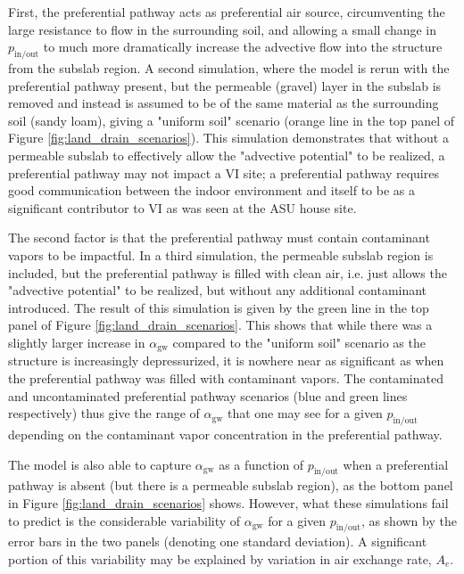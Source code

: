 \documentclass[journal=esthag,manuscript=article]{achemso}
\begin{document}
First, the preferential pathway acts as preferential air source, circumventing the large resistance to flow in the surrounding soil, and allowing a small change in $p_\mathrm{in/out}$ to much more dramatically increase the advective flow into the structure from the subslab region.
A second simulation, where the model is rerun with the preferential pathway present, but the permeable (gravel) layer in the subslab is removed and instead is assumed to be of the same material as the surrounding soil (sandy loam), giving a "uniform soil" scenario (orange line in the top panel of Figure \ref{fig:land_drain_scenarios}).
This simulation demonstrates that without a permeable subslab to effectively allow the "advective potential" to be realized, a preferential pathway may not impact a VI site; a preferential pathway requires good communication between the indoor environment and itself to be as a significant contributor to VI as was seen at the ASU house site.

The second factor is that the preferential pathway must contain contaminant vapors to be impactful.
In a third simulation, the permeable subslab region is included, but the preferential pathway is filled with clean air, i.e. just allows the "advective potential" to be realized, but without any additional contaminant introduced.
The result of this simulation is given by the green line in the top panel of Figure \ref{fig:land_drain_scenarios}.
This shows that while there was a slightly larger increase in $\alpha_\mathrm{gw}$ compared to the "uniform soil" scenario as the structure is increasingly depressurized, it is nowhere near as significant as when the preferential pathway was filled with contaminant vapors.
The contaminated and uncontaminated preferential pathway scenarios (blue and green lines respectively) thus give the range of $\alpha_\mathrm{gw}$ that one may see for a given $p_\mathrm{in/out}$ depending on the contaminant vapor concentration in the preferential pathway.

The model is also able to capture $\alpha_\mathrm{gw}$ as a function of $p_\mathrm{in/out}$ when a preferential pathway is absent (but there is a permeable subslab region), as the bottom panel in Figure \ref{fig:land_drain_scenarios} shows.
However, what these simulations fail to predict is the considerable variability of $\alpha_\mathrm{gw}$ for a given $p_\mathrm{in/out}$, as shown by the error bars in the two panels (denoting one standard deviation).
A significant portion of this variability may be explained by variation in air exchange rate, $A_e$.
\end{document}

